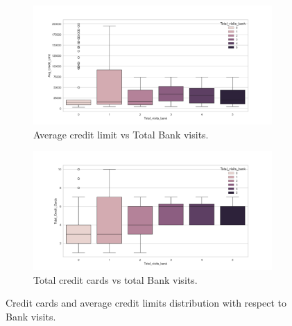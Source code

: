 \documentclass[10pt,a4paper]{style}
\begin{document}
		
		\begin{figure}[h]
			\centering
			\begin{subfigure}[t]{0.49\textwidth}
				\includegraphics[width=\textwidth]{bi_box_Total_visits_bank_Avg_Credit_Limit.png}
				\caption{Average credit limit vs Total Bank visits.}
				\label{fig:bi_box_Total_visits_bank_Avg_Credit_Limit.pngs}
			\end{subfigure}
			\hfill
			\begin{subfigure}[t]{0.49\textwidth}
				\includegraphics[width=\textwidth]{bi_box_Total_visits_bank_Total_Credit_Cards.png}
				\caption{Total credit cards vs total Bank visits.}
				\label{fig:bi_box_Total_visits_bank_Total_Credit_Cards.png}
			\end{subfigure}
			\caption{Credit cards and average credit limits distribution with respect to Bank visits.}
			\label{fig:Credit cards and average credit limits distribution with respect to Bank visits}
		\end{figure}
		
\end{document}
